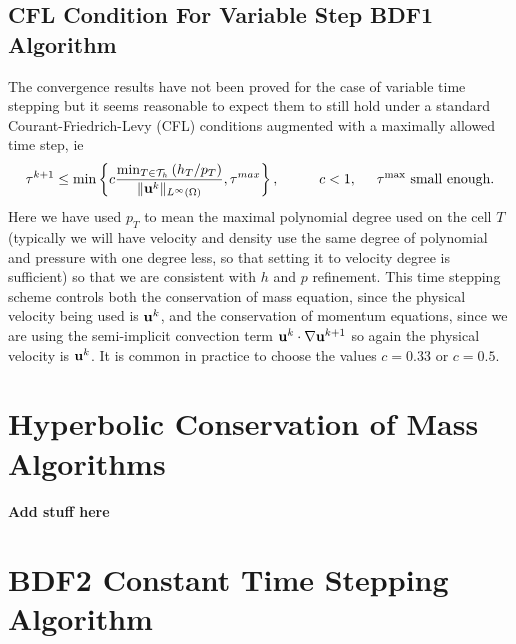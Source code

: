 \documentclass[letterpaper]{erdc}
\begin{document}
\subsection{CFL Condition For Variable Step BDF1 Algorithm}\label{sec:CFLBDF1}
The convergence results have not been proved for the case of variable time stepping but it seems reasonable to expect them to still hold under a standard Courant-Friedrich-Levy (CFL) conditions augmented with a maximally allowed time step, ie
\begin{equation}
  \tau^{k+1} \leq \min \left\{c \frac{\min_{T\in\mathcal{T}_h}\left(h_{T}/p_T\right)}{\|\textbf{u}^{k}\|_{L^{\infty}(\Omega)}}, \tau^{max}\right\}, \hspace{1cm} c<1, \hspace{0.5cm}\tau^{\max} \mbox{ small enough}.
\end{equation}
Here we have used $p_T$ to mean the maximal polynomial degree used on the cell $T$ (typically we will have velocity and density use the same degree of polynomial and pressure with one degree less, so that setting it to velocity degree is sufficient) so that we are consistent with $h$ and $p$ refinement.  This time stepping scheme controls both the conservation of mass equation, since the physical velocity being used is $\textbf{u}^{k}$, and the conservation of momentum equations, since we are using the semi-implicit convection term $\textbf{u}^{k}\cdot\nabla\textbf{u}^{k+1}$ so again the physical velocity is $\textbf{u}^{k}$.  It is common in practice to choose the values $c=0.33$ or $c=0.5$.


\section{Hyperbolic Conservation of Mass Algorithms}\label{sec:ConservationOfMassNumericalApproach}

\textbf{ Add stuff here}

%
%
\section{BDF2 Constant Time Stepping Algorithm}\label{sec:BDF2ConstantTimeSteppingAlgorithm}
\end{document}
